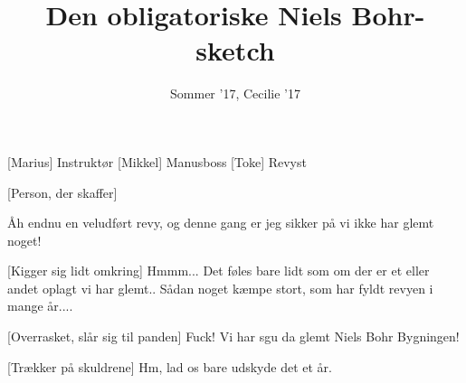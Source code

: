 \documentclass[a4paper,11pt]{article}
\title{Den obligatoriske Niels Bohr-sketch}
\author{Sommer '17, Cecilie '17}
\begin{document}
\maketitle

\begin{roles}
[Marius] Instruktør
[Mikkel] Manusboss
[Toke] Revyst
\end{roles}

\begin{props}
[Person, der skaffer]
\end{props}


\begin{sketch}


 Åh endnu en veludført revy, og denne gang er jeg sikker på vi ikke har glemt noget!

[Kigger sig lidt omkring] Hmmm... Det føles bare lidt som om der er et eller andet oplagt vi har glemt.. Sådan noget kæmpe stort, som har fyldt revyen i mange år....

[Overrasket, slår sig til panden] Fuck! Vi har sgu da glemt Niels Bohr Bygningen!

[Trækker på skuldrene] Hm, lad os bare udskyde det et år.

\end{sketch}
\end{document}
